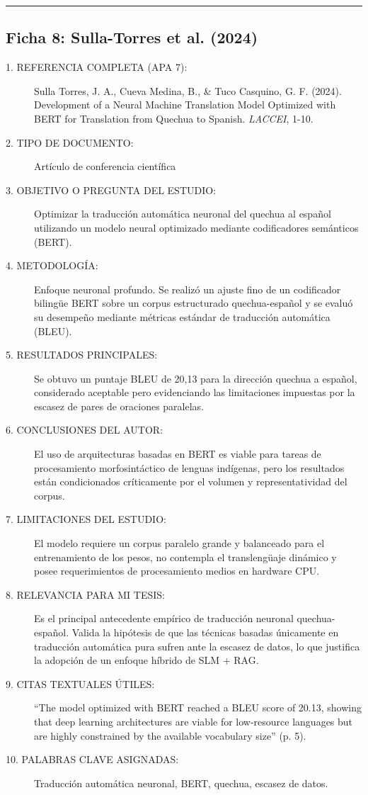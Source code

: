 \vspace{0.5cm}
\hrule
\vspace{0.5cm}

\subsection*{Ficha 8: Sulla-Torres et al. (2024)}
\begin{description}
	\item[1. REFERENCIA COMPLETA (APA 7):] Sulla Torres, J. A., Cueva Medina, B., \& Tuco Casquino, G. F. (2024). Development of a Neural Machine Translation Model Optimized with BERT for Translation from Quechua to Spanish. \textit{LACCEI}, 1-10.
	\item[2. TIPO DE DOCUMENTO:] Artículo de conferencia científica
	\item[3. OBJETIVO O PREGUNTA DEL ESTUDIO:] Optimizar la traducción automática neuronal del quechua al español utilizando un modelo neural optimizado mediante codificadores semánticos (BERT).
	\item[4. METODOLOGÍA:] Enfoque neuronal profundo. Se realizó un ajuste fino de un codificador bilingüe BERT sobre un corpus estructurado quechua-español y se evaluó su desempeño mediante métricas estándar de traducción automática (BLEU).
	\item[5. RESULTADOS PRINCIPALES:] Se obtuvo un puntaje BLEU de 20,13 para la dirección quechua a español, considerado aceptable pero evidenciando las limitaciones impuestas por la escasez de pares de oraciones paralelas.
	\item[6. CONCLUSIONES DEL AUTOR:] El uso de arquitecturas basadas en BERT es viable para tareas de procesamiento morfosintáctico de lenguas indígenas, pero los resultados están condicionados críticamente por el volumen y representatividad del corpus.
	\item[7. LIMITACIONES DEL ESTUDIO:] El modelo requiere un corpus paralelo grande y balanceado para el entrenamiento de los pesos, no contempla el translengüaje dinámico y posee requerimientos de procesamiento medios en hardware CPU.
	\item[8. RELEVANCIA PARA MI TESIS:] Es el principal antecedente empírico de traducción neuronal quechua-español. Valida la hipótesis de que las técnicas basadas únicamente en traducción automática pura sufren ante la escasez de datos, lo que justifica la adopción de un enfoque híbrido de SLM + RAG.
	\item[9. CITAS TEXTUALES ÚTILES:] ``The model optimized with BERT reached a BLEU score of 20.13, showing that deep learning architectures are viable for low-resource languages but are highly constrained by the available vocabulary size'' (p. 5).
	\item[10. PALABRAS CLAVE ASIGNADAS:] Traducción automática neuronal, BERT, quechua, escasez de datos.
\end{description}

